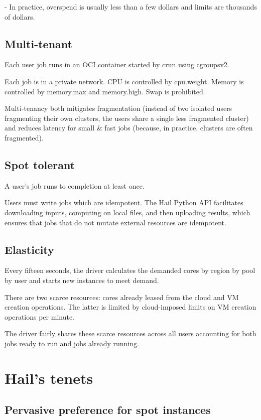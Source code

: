 \documentclass[10pt,a4paper%
]{article}
\begin{document}
      - In practice, overspend is usually less than a few dollars and limits are thousands of dollars.

\subsection{Multi-tenant}

Each user job runs in an OCI container started by crun using cgroupsv2.

Each job is in a private network. CPU is controlled by cpu.weight. Memory is controlled by memory.max and memory.high. Swap is prohibited.

Multi-tenancy both mitigates fragmentation (instead of two isolated users fragmenting their own clusters, the users share a single less fragmented cluster) and reduces latency for small \& fast jobs (because, in practice, clusters are often fragmented).

\subsection{Spot tolerant}
A user’s job runs to completion at least once.

Users must write jobs which are idempotent. The Hail Python API facilitates downloading inputs, computing on local files, and then uploading results, which ensures that jobs that do not mutate external resources are idempotent.

\subsection{Elasticity}

Every fifteen seconds, the driver calculates the demanded cores by region by pool by user and starts new instances to meet demand.

There are two scarce resources: cores already leased from the cloud and VM creation operations. The latter is limited by cloud-imposed limits on VM creation operations per minute.

The driver fairly shares these scarce resources across all users accounting for both jobs ready to run and jobs already running.

\section{Hail’s tenets}

\subsection{Pervasive preference for spot instances}
\end{document}
